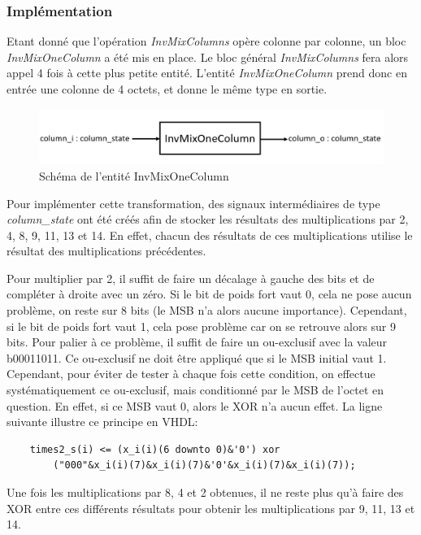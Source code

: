 \documentclass[a4paper, 12pt]{article}
\begin{document}
		\subsubsection{Implémentation}
	Etant donné que l'opération \emph{InvMixColumns} opère colonne par colonne, un bloc \emph{InvMixOneColumn} a été mis en place. Le bloc général \emph{InvMixColumns} fera alors appel 4 fois à cette plus petite entité.	L'entité \emph{InvMixOneColumn} prend donc en entrée une colonne de 4 octets, et donne le même type en sortie.
			\begin{figure}[H]
				\begin{center}
				\includegraphics[scale=0.4]{Images/InvMixOneColumnEntity.png}
				\end{center}
				\caption{Schéma de l'entité InvMixOneColumn}
				\label{InvMixOneColumnEntity}
			\end{figure}
Pour implémenter cette transformation, des signaux intermédiaires de type \emph{column\_state} ont été créés afin de stocker les résultats des multiplications par 2, 4, 8, 9, 11, 13 et 14. En effet, chacun des résultats de ces multiplications utilise le résultat des multiplications précédentes. 
\par Pour multiplier par 2, il suffit de faire un décalage à gauche des bits et de compléter à droite avec un zéro. Si le bit de poids fort vaut 0, cela ne pose aucun problème, on reste sur 8 bits (le MSB n'a alors aucune importance). Cependant, si le bit de poids fort vaut 1, cela pose problème car on se retrouve alors sur 9 bits. Pour palier à ce problème, il suffit de faire un ou-exclusif avec la valeur b00011011. Ce ou-exclusif ne doit être appliqué que si le MSB initial vaut 1. Cependant, pour éviter de tester à chaque fois cette condition, on effectue systématiquement ce ou-exclusif, mais conditionné par le MSB de l'octet en question. En effet, si ce MSB vaut 0, alors le XOR n'a aucun effet. La ligne suivante illustre ce principe en VHDL:
		\begin{lstlisting}
	times2_s(i) <= (x_i(i)(6 downto 0)&'0') xor 
		("000"&x_i(i)(7)&x_i(i)(7)&'0'&x_i(i)(7)&x_i(i)(7));
		\end{lstlisting}
\par Une fois les multiplications par 8, 4 et 2 obtenues, il ne reste plus qu'à faire des XOR entre ces différents résultats pour obtenir les multiplications par 9, 11, 13 et 14.
\end{document}
